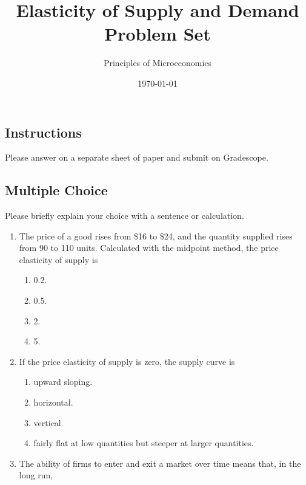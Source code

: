 \documentclass{article}
\title{Elasticity of Supply and Demand Problem Set}
\author{Principles of Microeconomics}
\date{\today}
\begin{document}
\maketitle

\subsection*{Instructions} Please answer on a separate sheet of paper and submit on Gradescope.

\subsection*{Multiple Choice} Please briefly explain your choice with a sentence or calculation.

\begin{enumerate}

\item The price of a good rises from \$16 to \$24, and the quantity supplied rises from 90 to 110 units. Calculated with the midpoint method, the price elasticity of supply is

	\begin{enumerate}
	
	\item 0.2.
	
	\item 0.5.
	
	\item 2.
	
	\item 5.	
	
	\end{enumerate}
	
\item If the price elasticity of supply is zero, the supply curve is

	\begin{enumerate}
	
	\item upward sloping.
	
	\item horizontal.
	
	\item vertical.
	
	\item fairly flat at low quantities but steeper at larger quantities.
	
	\end{enumerate}
	
\item The ability of firms to enter and exit a market over time means that, in the long run,


\end{enumerate}
\end{document}
